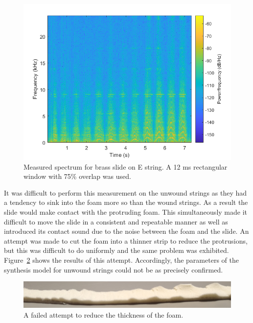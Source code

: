 \documentclass[../main.tex]{subfiles}
\begin{document}
\begin{figure}[h]
    \centering
    \includegraphics[scale=.65]{./images/plots/ContactNoiseEBrass.png}
    \caption{Measured spectrum for brass slide on E string. A 12 ms rectangular window with 75\% overlap was used.}
    \label{fig:ContactNoiseEBrass}
\end{figure}

It was difficult to perform this measurement on the unwound strings as they had a tendency to sink into the foam more so than the wound strings. As a result the slide would make contact with the protruding foam. This simultaneously made it difficult to move the slide in a consistent and repeatable manner as well as introduced its contact sound due to the noise between the foam and the slide. An attempt was made to cut the foam into a thinner strip to reduce the protrusions, but this was difficult to do uniformly and the same problem was exhibited. Figure~\ref{fig:CutFoam} shows the results of this attempt. Accordingly, the parameters of the synthesis model for unwound strings could not be as precisely confirmed.

\begin{figure}[h]
    \centering
    \includegraphics[scale=.15]{./images/pictures/CutFoam.png}
    \caption{A failed attempt to reduce the thickness of the foam.}
    \label{fig:CutFoam}
\end{figure}
\end{document}
